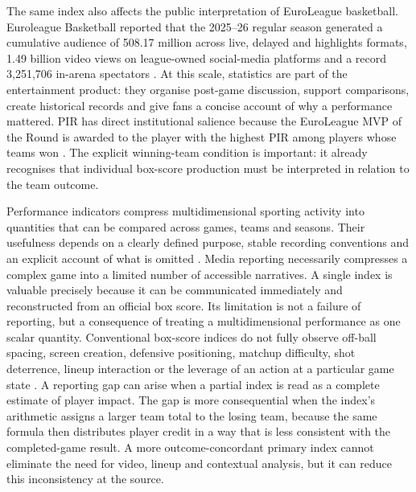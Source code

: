 \documentclass[pdflatex,sn-mathphys-num]{sn-jnl}
\begin{document}
The same index also affects the public interpretation of EuroLeague basketball. Euroleague Basketball reported that the 2025--26 regular season generated a cumulative audience of 508.17 million across live, delayed and highlights formats, 1.49 billion video views on league-owned social-media platforms and a record 3,251,706 in-arena spectators \cite{EuroleagueEngagement2026}. At this scale, statistics are part of the entertainment product: they organise post-game discussion, support comparisons, create historical records and give fans a concise account of why a performance mattered. PIR has direct institutional salience because the EuroLeague MVP of the Round is awarded to the player with the highest PIR among players whose teams won \cite{EuroleagueAwards2024}. The explicit winning-team condition is important: it already recognises that individual box-score production must be interpreted in relation to the team outcome.

Performance indicators compress multidimensional sporting activity into quantities that can be compared across games, teams and seasons. Their usefulness depends on a clearly defined purpose, stable recording conventions and an explicit account of what is omitted \cite{HughesBartlett2002,MandicEtAl2019}. Media reporting necessarily compresses a complex game into a limited number of accessible narratives. A single index is valuable precisely because it can be communicated immediately and reconstructed from an official box score. Its limitation is not a failure of reporting, but a consequence of treating a multidimensional performance as one scalar quantity. Conventional box-score indices do not fully observe off-ball spacing, screen creation, defensive positioning, matchup difficulty, shot deterrence, lineup interaction or the leverage of an action at a particular game state \cite{DeshpandeJensen2016,SarlisTjortjis2020,TernerFranks2021,reich2006,franks2015,cervone2016,gudmundsson2017,jiao2021}. A reporting gap can arise when a partial index is read as a complete estimate of player impact. The gap is more consequential when the index's arithmetic assigns a larger team total to the losing team, because the same formula then distributes player credit in a way that is less consistent with the completed-game result. A more outcome-concordant primary index cannot eliminate the need for video, lineup and contextual analysis, but it can reduce this inconsistency at the source.
\end{document}
